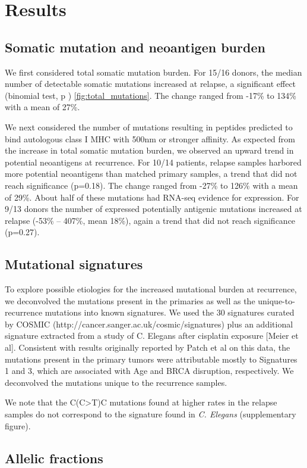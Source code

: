 \section*{Results}
\subsection*{Somatic mutation and neoantigen burden}

We first considered total somatic mutation burden. For 15/16 donors, the median number of detectable somatic mutations increased at relapse, a significant effect (binomial test, p ) \ref{fig:total_mutations}. The change ranged from -17\% to 134\% with a mean of 27\%.

We next considered the number of mutations resulting in peptides predicted to bind autologous class I MHC with 500nm or stronger affinity. As expected from the increase in total somatic mutation burden, we observed an upward trend in potential neoantigens at recurrence. For 10/14 patients, relapse samples harbored more potential neoantigens than matched primary samples, a trend that did not reach significance (p=0.18). The change ranged from -27\% to 126\% with a mean of 29\%. About half of these mutations had RNA-seq evidence for expression. For 9/13 donors the number of expressed potentially antigenic mutations increased at relapse (-53\% -- 407\%, mean 18\%), again a trend that did not reach significance (p=0.27).


\subsection*{Mutational signatures}
To explore possible etiologies for the increased mutational burden at recurrence, we deconvolved the mutations present in the primaries as well as the unique-to-recurrence mutations into known signatures. We used the 30 signatures curated by COSMIC (http://cancer.sanger.ac.uk/cosmic/signatures) plus an additional signature extracted from a study of C. Elegans after cisplatin exposure [Meier et al]. Consistent with results originally reported by Patch et al on this data, the mutations present in the primary tumors were attributable mostly to Signatures 1 and 3, which are associated with Age and BRCA disruption, respectively. We deconvolved the mutations unique to the recurrence samples. 

We note that the C(C>T)C mutations found at higher rates in the relapse samples do not correspond to the signature found in \textit{C. Elegans} (supplementary figure).

\subsection*{Allelic fractions}



